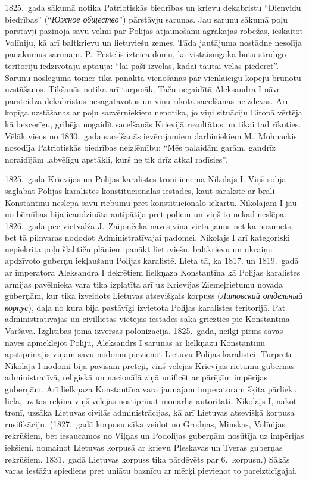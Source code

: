 \documentclass[twoside,a5paper,12pt,fleqn,openany]{extbook}
\newcommand{\rutxti}[1]{\textit{\textrussian{#1}}}
\begin{document}
1825.~gada sākumā notika Patriotiskās biedrības un krievu dekabristu ``Dienvidu biedrības'' (``\rutxti{Южное общество}'') pārstāvju sarunas. Jau sarunu sākumā poļu pārstāvji paziņoja savu vēlmi par Polijas atjaunošanu agrākajās robežās, ieskaitot Volīniju, kā arī baltkrievu un lietuviešu zemes. Tāda jautājuma nostādne nesolīja panākumus sarunām. P.~Pestelis izteica domu, ka vistaisnīgākā būtu strīdīgo teritoriju iedzīvotāju aptauja: ``lai paši izvēlas, kādai tautai vēlas piederēt''. Sarunu noslēgumā tomēr tika panākta vienošanās par vienlaicīgu kopēju bruņotu uzstāšanos. Tikšanās notika arī turpmāk. Taču negaidītā Aleksandra I nāve pārsteidza dekabristus nesagatavotus un viņu rīkotā sacelšanās neizdevās. Arī kopīga uzstāšanas ar poļu sazvērniekiem nenotika, jo viņi situāciju Eiropā vērtēja kā bezcerīgu, gribēja nogaidīt sacelšanās Krievijā rezultātus un tikai tad rīkoties. Vēlāk viens no 1830.~gada sacelšanās ievērojamiem darbiniekiem M.~Mohnackis nosodīja Patriotiskās biedrības neizlēmību: ``Mēs palaidām garām, gandrīz noraidījām labvēlīgu apstākli, kurš ne tik drīz atkal radīsies''.

1825.~gadā Krievijas un Polijas karalistes troni ieņēma Nikolajs I. Viņš solīja saglabāt Polijas karalistes konstitucionālās iestādes, kaut sarakstē ar brāli Konstantīnu neslēpa savu riebumu pret konstitucionālo iekārtu. Nikolajam I jau no bērnības bija ieaudzināta antipātija pret poļiem un viņš to nekad neslēpa. 1826.~gadā pēc vietvalža J.~Zaijončeka nāves viņa vietā jauns netika nozīmēts, bet tā pilnvaras nododot Administratīvajai padomei. Nikolajs I arī kategoriski nepiekrita poļu šļahtiču plāniem panākt lietuviešu, baltkrievu un ukraiņu apdzīvoto guberņu iekļaušanu Polijas karalistē. Lieta tā, ka 1817. un 1819.~gadā ar imperatora Aleksandra I dekrētiem lielkņaza Konstantīna kā Polijas karalistes armijas pavēlnieka vara tika izplatīta arī uz Krievijas Ziemeļrietumu novada guberņām, kur tika izveidots Lietuvas atsevišķais korpuss (\rutxti{Литовский отдельный корпус}), daļa no kura bija pastāvīgi izvietota Polijas karalistes teritorijā. Pat administratīvajās un civillietās vietējās iestādes sāka griezties pie Konstantīna Varšavā. Izglītības jomā izvērsās polonizācija. 1825.~gadā, neilgi pirms savas nāves apmeklējot Poliju, Aleksandrs I sarunās ar lielkņazu Konstantīnu apstiprinājis viņam savu nodomu pievienot Lietuvu Polijas karalistei. Turpretī Nikolaja I nodomi bija pavisam pretēji, viņš vēlējās Krievijas rietumu guberņas administratīvā, reliģiskā un nacionālā ziņā unificēt ar pārējām impērijas guberņām. Arī lielkņaza Konstantīna vara jaunajam imperatoram šķita pārlieku liela, uz tās rēķina viņš vēlējās nostiprināt monarha autoritāti. Nikolajs I, nākot tronī, uzsāka Lietuvas civilās administrācijas, kā arī Lietuvas atsevišķā korpusa rusifikāciju. (1827.~gadā korpusu sāka veidot no Grodņas, Minskas, Volīnijas rekrūšiem, bet iesaucamos no Viļņas un Podolijas guberņām nosūtīja uz impērijas iekšieni, nomainot Lietuvas korpusā ar krievu Pleskavas un Tveras guberņas rekrūšiem. 1831.~gadā Lietuvas korpuss tika pārdēvēts par 6.~korpusu.) Sākās varas iestāžu spiediens pret uniātu baznīcu ar mērķi pievienot to pareizticīgajai.
\end{document}
